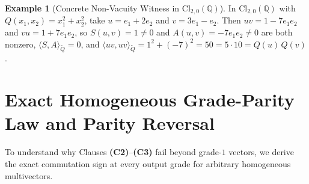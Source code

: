 \documentclass[11pt]{article}
\theoremstyle{plain}
\theoremstyle{definition}
\newtheorem{example}[theorem]{Example}
\theoremstyle{remark}
\newcommand{\Cl}{\mathrm{Cl}}
\begin{document}
\begin{example}[Concrete Non-Vacuity Witness in $\Cl_{2,0}(\mathbb{Q})$]\label{ex:nonvac}
In $\Cl_{2,0}(\mathbb{Q})$ with $Q(x_1, x_2) = x_1^2 + x_2^2$, take $u = e_1 + 2 e_2$ and $v = 3 e_1 - e_2$. Then $u v = 1 - 7 e_1 e_2$ and $v u = 1 + 7 e_1 e_2$, so $S(u, v) = 1 \neq 0$ and $A(u, v) = -7 e_1 e_2 \neq 0$ are both nonzero, $\langle S, A \rangle_{\widetilde{Q}} = 0$, and $\langle u v, u v \rangle_{\widetilde{Q}} = 1^2 + (-7)^2 = 50 = 5 \cdot 10 = Q(u)\,Q(v)$.
\end{example}

\section{Exact Homogeneous Grade-Parity Law and Parity Reversal}

To understand why Clauses \textbf{(C2)}--\textbf{(C3)} fail beyond grade-$1$ vectors, we derive the exact commutation sign at every output grade for arbitrary homogeneous multivectors.
\end{document}
